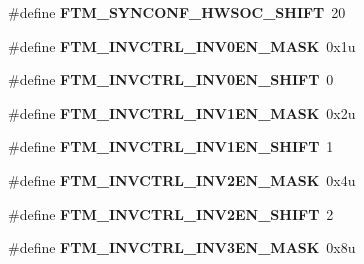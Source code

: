 \begin{DoxyCompactItemize}
\item 
\hypertarget{group___f_t_m___register___masks_ga1732b95468145109564e4fa367dfc2a8}{}\#define {\bfseries F\+T\+M\+\_\+\+S\+Y\+N\+C\+O\+N\+F\+\_\+\+H\+W\+S\+O\+C\+\_\+\+S\+H\+I\+F\+T}~20\label{group___f_t_m___register___masks_ga1732b95468145109564e4fa367dfc2a8}

\item 
\hypertarget{group___f_t_m___register___masks_ga29b0b3d76d82f4c673556bd71b97ee9d}{}\#define {\bfseries F\+T\+M\+\_\+\+I\+N\+V\+C\+T\+R\+L\+\_\+\+I\+N\+V0\+E\+N\+\_\+\+M\+A\+S\+K}~0x1u\label{group___f_t_m___register___masks_ga29b0b3d76d82f4c673556bd71b97ee9d}

\item 
\hypertarget{group___f_t_m___register___masks_ga15a13f74f3f9db42b9be7ce492976fef}{}\#define {\bfseries F\+T\+M\+\_\+\+I\+N\+V\+C\+T\+R\+L\+\_\+\+I\+N\+V0\+E\+N\+\_\+\+S\+H\+I\+F\+T}~0\label{group___f_t_m___register___masks_ga15a13f74f3f9db42b9be7ce492976fef}

\item 
\hypertarget{group___f_t_m___register___masks_gaaa85e1e86e9cc91e49e68c33a91d5194}{}\#define {\bfseries F\+T\+M\+\_\+\+I\+N\+V\+C\+T\+R\+L\+\_\+\+I\+N\+V1\+E\+N\+\_\+\+M\+A\+S\+K}~0x2u\label{group___f_t_m___register___masks_gaaa85e1e86e9cc91e49e68c33a91d5194}

\item 
\hypertarget{group___f_t_m___register___masks_ga6d544c535dc1c3710f37e5ed3f0e6acc}{}\#define {\bfseries F\+T\+M\+\_\+\+I\+N\+V\+C\+T\+R\+L\+\_\+\+I\+N\+V1\+E\+N\+\_\+\+S\+H\+I\+F\+T}~1\label{group___f_t_m___register___masks_ga6d544c535dc1c3710f37e5ed3f0e6acc}

\item 
\hypertarget{group___f_t_m___register___masks_ga529f3c3f58ca2c039fee08830dfe3a8a}{}\#define {\bfseries F\+T\+M\+\_\+\+I\+N\+V\+C\+T\+R\+L\+\_\+\+I\+N\+V2\+E\+N\+\_\+\+M\+A\+S\+K}~0x4u\label{group___f_t_m___register___masks_ga529f3c3f58ca2c039fee08830dfe3a8a}

\item 
\hypertarget{group___f_t_m___register___masks_gaf304b51f57fe6a028674e4de62558868}{}\#define {\bfseries F\+T\+M\+\_\+\+I\+N\+V\+C\+T\+R\+L\+\_\+\+I\+N\+V2\+E\+N\+\_\+\+S\+H\+I\+F\+T}~2\label{group___f_t_m___register___masks_gaf304b51f57fe6a028674e4de62558868}

\item 
\hypertarget{group___f_t_m___register___masks_ga1f9f536afb4e0b9b5041f35b51dc0008}{}\#define {\bfseries F\+T\+M\+\_\+\+I\+N\+V\+C\+T\+R\+L\+\_\+\+I\+N\+V3\+E\+N\+\_\+\+M\+A\+S\+K}~0x8u\label{group___f_t_m___register___masks_ga1f9f536afb4e0b9b5041f35b51dc0008}


\end{DoxyCompactItemize}
